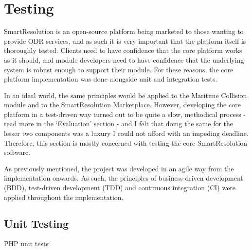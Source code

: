 \chapter{Testing} %

SmartResolution is an open-source platform being marketed to those wanting to provide ODR services, and as such it is very important that the platform itself is thoroughly tested. Clients need to have confidence that the core platform works as it should, and module developers need to have confidence that the underlying system is robust enough to support their module. For these reasons, the core platform implementation was done alongside unit and integration tests.

In an ideal world, the same principles would be applied to the Maritime Collision module and to the SmartResolution Marketplace. However, developing the core platform in a test-driven way turned out to be quite a slow, methodical process - read more in the `Evaluation' section - and I felt that doing the same for the lesser two components was a luxury I could not afford with an impeding deadline. Therefore, this section is mostly concerned with testing the core SmartResolution software.

As previously mentioned, the project was developed in an agile way from the implementation onwards. As such, the principles of business-driven development (BDD), test-driven development (TDD) and continuous integration (CI) were applied throughout the implementation.

\section{Unit Testing}

PHP unit tests

